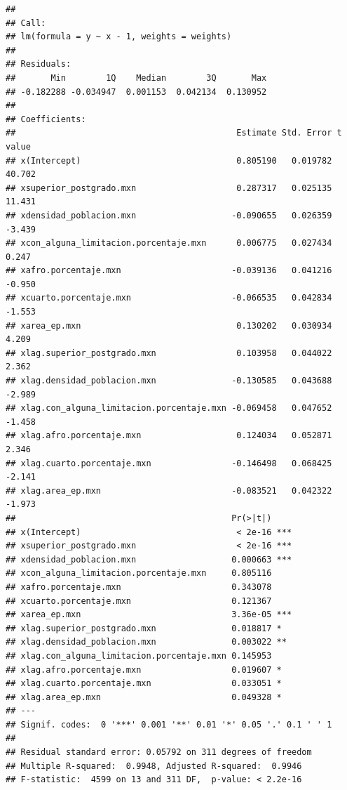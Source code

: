 \documentclass[12pt,]{book}
\newenvironment{Shaded}{\begin{snugshade}}{\end{snugshade}}
\newcommand{\KeywordTok}[1]{\textcolor[rgb]{0.13,0.29,0.53}{\textbf{#1}}}
\newcommand{\DataTypeTok}[1]{\textcolor[rgb]{0.13,0.29,0.53}{#1}}
\newcommand{\CommentTok}[1]{\textcolor[rgb]{0.56,0.35,0.01}{\textit{#1}}}
\newcommand{\OperatorTok}[1]{\textcolor[rgb]{0.81,0.36,0.00}{\textbf{#1}}}
\newcommand{\NormalTok}[1]{#1}
\begin{document}
\begin{Shaded}
\end{Shaded}

\begin{verbatim}
## 
## Call:
## lm(formula = y ~ x - 1, weights = weights)
## 
## Residuals:
##       Min        1Q    Median        3Q       Max 
## -0.182288 -0.034947  0.001153  0.042134  0.130952 
## 
## Coefficients:
##                                            Estimate Std. Error t value
## x(Intercept)                               0.805190   0.019782  40.702
## xsuperior_postgrado.mxn                    0.287317   0.025135  11.431
## xdensidad_poblacion.mxn                   -0.090655   0.026359  -3.439
## xcon_alguna_limitacion.porcentaje.mxn      0.006775   0.027434   0.247
## xafro.porcentaje.mxn                      -0.039136   0.041216  -0.950
## xcuarto.porcentaje.mxn                    -0.066535   0.042834  -1.553
## xarea_ep.mxn                               0.130202   0.030934   4.209
## xlag.superior_postgrado.mxn                0.103958   0.044022   2.362
## xlag.densidad_poblacion.mxn               -0.130585   0.043688  -2.989
## xlag.con_alguna_limitacion.porcentaje.mxn -0.069458   0.047652  -1.458
## xlag.afro.porcentaje.mxn                   0.124034   0.052871   2.346
## xlag.cuarto.porcentaje.mxn                -0.146498   0.068425  -2.141
## xlag.area_ep.mxn                          -0.083521   0.042322  -1.973
##                                           Pr(>|t|)    
## x(Intercept)                               < 2e-16 ***
## xsuperior_postgrado.mxn                    < 2e-16 ***
## xdensidad_poblacion.mxn                   0.000663 ***
## xcon_alguna_limitacion.porcentaje.mxn     0.805116    
## xafro.porcentaje.mxn                      0.343078    
## xcuarto.porcentaje.mxn                    0.121367    
## xarea_ep.mxn                              3.36e-05 ***
## xlag.superior_postgrado.mxn               0.018817 *  
## xlag.densidad_poblacion.mxn               0.003022 ** 
## xlag.con_alguna_limitacion.porcentaje.mxn 0.145953    
## xlag.afro.porcentaje.mxn                  0.019607 *  
## xlag.cuarto.porcentaje.mxn                0.033051 *  
## xlag.area_ep.mxn                          0.049328 *  
## ---
## Signif. codes:  0 '***' 0.001 '**' 0.01 '*' 0.05 '.' 0.1 ' ' 1
## 
## Residual standard error: 0.05792 on 311 degrees of freedom
## Multiple R-squared:  0.9948, Adjusted R-squared:  0.9946 
## F-statistic:  4599 on 13 and 311 DF,  p-value: < 2.2e-16
\end{verbatim}
\end{document}
